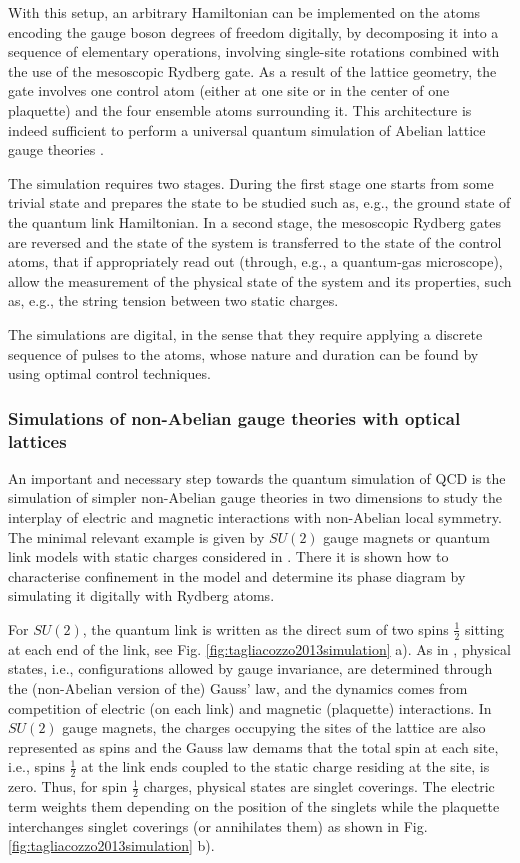 \documentclass[epj,final]{svjour}
\begin{document}
With this setup, an arbitrary Hamiltonian can be implemented on the atoms encoding the gauge boson degrees of freedom digitally, by decomposing it into a sequence of elementary operations, involving single-site rotations combined with the use of the mesoscopic Rydberg gate. As a result of the lattice geometry, the gate involves  one control atom  (either at one site or in the center of one plaquette) and the four ensemble atoms surrounding it.  This architecture is indeed sufficient to perform a universal quantum simulation of  Abelian lattice gauge theories \cite{weimer2010rydberg}.

The simulation requires two stages. During the first stage one starts from some trivial state and prepares the state to be studied such as, e.g., the ground state of the quantum link Hamiltonian. In a second stage, the mesoscopic Rydberg gates are reversed and the state of the system is transferred to the state of the control atoms, that if appropriately read out (through, e.g., a quantum-gas microscope), allow the measurement of the physical state of the system and its properties, such as, e.g., the string tension between two static charges.

The simulations are digital, in the sense that they require applying a discrete sequence of pulses to the atoms, whose nature and  duration can be found by using optimal control techniques. 

\subsubsection{Simulations of non-Abelian gauge theories with optical lattices\cite{tagliacozzo2013simulation}}

An important and necessary step towards the quantum simulation of QCD is the simulation of simpler non-Abelian gauge theories in two dimensions to study the interplay of electric and magnetic interactions with non-Abelian local symmetry. The minimal relevant example is given by $SU(2)$ gauge magnets or quantum link models \cite{Orland1990,Chandrasekharan:1996ih} with static charges considered in \cite{tagliacozzo2013simulation}. There it is shown how to characterise confinement in the model and determine its phase diagram by simulating it digitally with Rydberg atoms.

For $SU(2)$, the quantum link is written as the direct sum of two spins $\frac 12$  sitting at each end of the link, see Fig. \ref{fig:tagliacozzo2013simulation} a). As in \cite{Kogut1975}, physical states, i.e., configurations allowed by gauge invariance, are determined through the (non-Abelian version of the) Gauss' law, and the dynamics comes from competition of electric (on each link) and magnetic (plaquette) interactions. In $SU(2)$ gauge magnets, the charges occupying the sites of the lattice are also represented as spins and the Gauss law demams that the total spin at each site, i.e., spins $\frac 12$ at the link ends coupled to the static charge residing at the site, is zero. Thus, for spin $\frac 12$ charges, physical states are singlet coverings. The electric term weights them depending on the position of the singlets while the plaquette interchanges singlet coverings (or annihilates them) as shown in Fig. \ref{fig:tagliacozzo2013simulation} b).     
\end{document}
